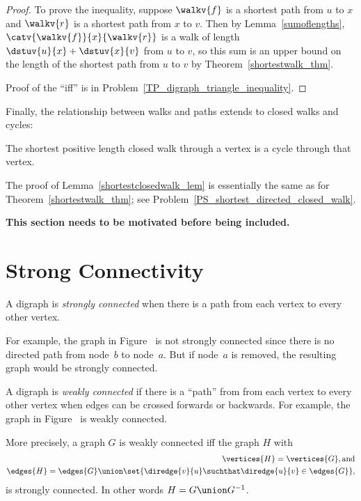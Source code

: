 \begin{proof}
  To prove the inequality, suppose $\walkv{f}$ is a shortest path from
  $u$ to $x$ and $\walkv{r}$ is a shortest path from $x$ to $v$.  Then
  by Lemma~\ref{sumoflengths}, $\catv{\walkv{f}}{x}{\walkv{r}}$ is a
  walk of length $\dstuv{u}{x} + \dstuv{x}{v}$ from $u$ to $v$, so
  this sum is an upper bound on the length of the shortest path from
  $u$ to $v$ by Theorem~\ref{shortestwalk_thm}.

  Proof of the ``iff'' is in Problem~\ref{TP_digraph_triangle_inequality}.
\end{proof}

Finally, the relationship between walks and paths extends to closed walks and
cycles:
\begin{lemma}\label{shortestclosedwalk_lem}
The shortest positive length closed walk through a vertex is a cycle
through that vertex.
\end{lemma}

The proof of Lemma~\ref{shortestclosedwalk_lem} is essentially the
same as for Theorem~\ref{shortestwalk_thm}; see
Problem~\ref{PS_shortest_directed_closed_walk}.

\begin{editingnotes}

\textbf{This section needs to be motivated before being included.}

\section{Strong Connectivity}

\begin{definition}
A digraph is \emph{strongly connected}%
when there is a path from each vertex to every other vertex.
\end{definition}

For example, the graph in Figure~%
is not strongly connected since there is no directed path from
node~$b$ to node~$a$.  But if node~$a$ is removed, the resulting graph
would be strongly connected.

A digraph is \emph{weakly connected}%
\iffalse or, more simply,
\emph{connected})\fi if there is a ``path'' from from each vertex to
every other vertex when edges can be crossed forwards or backwards.
For example, the graph in Figure~%
is weakly connected.

More precisely, a graph $G$ is weakly connected iff the graph $H$ with
\begin{align*}
\vertices{H} = \vertices{G}, \text{and}\\
\edges{H} = \edges{G} \union \set{\diredge{v}{u} \suchthat \diredge{u}{v} \in \edges{G}},
\end{align*}
is strongly connected.  In other words $H = G \union G^{-1}$.
\end{editingnotes}

